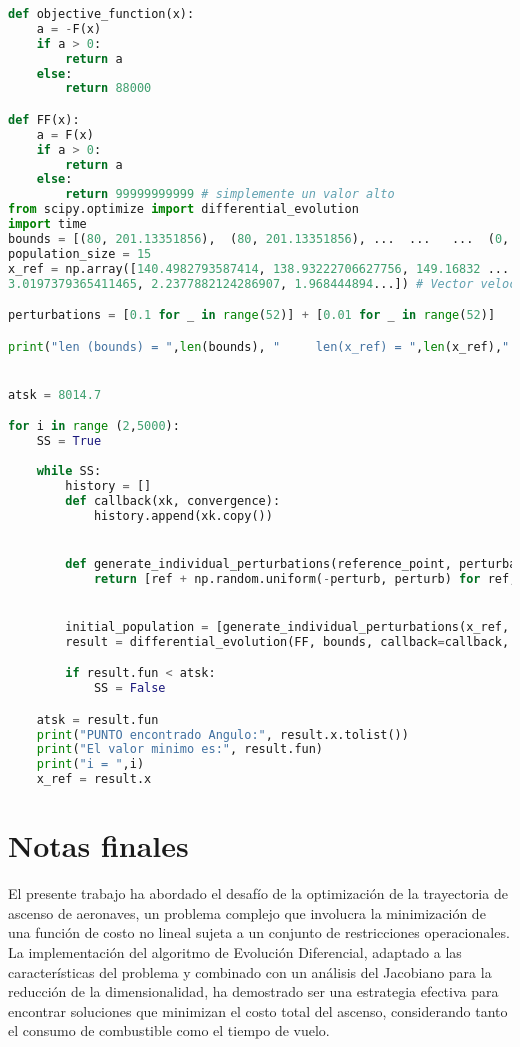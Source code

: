 \documentclass[fleqn]{article}
\begin{document}
\begin{lstlisting}[language=Python, firstnumber=last, style = mystyle, mathescape=true]
def objective_function(x):
    a = -F(x)
    if a > 0:
        return a
    else:
        return 88000

def FF(x): 
    a = F(x)
    if a > 0:
        return a
    else:
        return 99999999999 # simplemente un valor alto
from scipy.optimize import differential_evolution
import time
bounds = [(80, 201.13351856),  (80, 201.13351856), ...  ...   ...  (0, 0.1), (0, 0.1)] # Limites de exploracion considerados en la busqueda
population_size = 15
x_ref = np.array([140.4982793587414, 138.93222706627756, 149.16832 ...
3.0197379365411465, 2.2377882124286907, 1.968444894...]) # Vector velocidades - angulos

perturbations = [0.1 for _ in range(52)] + [0.01 for _ in range(52)]

print("len (bounds) = ",len(bounds), "     len(x_ref) = ",len(x_ref),"   perturbations = ",len(perturbations) )


atsk = 8014.7

for i in range (2,5000):
    SS = True
    
    while SS:
        history = []
        def callback(xk, convergence):
            history.append(xk.copy())


        def generate_individual_perturbations(reference_point, perturbations):
            return [ref + np.random.uniform(-perturb, perturb) for ref, perturb in zip(reference_point, perturbations)]


        initial_population = [generate_individual_perturbations(x_ref, perturbations) for _ in range(population_size)]
        result = differential_evolution(FF, bounds, callback=callback, init=np.array(initial_population))

        if result.fun < atsk:
            SS = False

    atsk = result.fun 
    print("PUNTO encontrado Angulo:", result.x.tolist())
    print("El valor minimo es:", result.fun)
    print("i = ",i)
    x_ref = result.x

\end{lstlisting}

\section{Notas finales}

El presente trabajo ha abordado el desafío de la optimización de la trayectoria de ascenso de aeronaves, un problema complejo que involucra la minimización de una función de costo no lineal sujeta a un conjunto de restricciones operacionales. La implementación del algoritmo de Evolución Diferencial, adaptado a las características del problema y combinado con un análisis del Jacobiano para la reducción de la dimensionalidad, ha demostrado ser una estrategia efectiva para encontrar soluciones que minimizan el costo total del ascenso, considerando tanto el consumo de combustible como el tiempo de vuelo.
\vspace{0.5cm}
\end{document}
